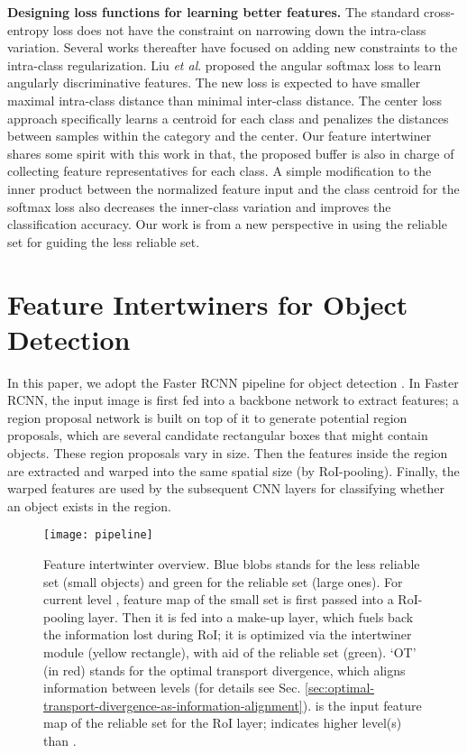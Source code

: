 \documentclass{article} \usepackage{iclr2019_conference,times}
\begin{document}
\textbf{Designing loss functions for learning better features.} The standard cross-entropy loss does not have the constraint on narrowing down the intra-class variation. 
Several works thereafter have focused on adding new constraints to the intra-class regularization.
Liu \textit{et al}. \citep{liu2017_spherical_loss} proposed the angular softmax loss to learn angularly discriminative features. The new loss is expected to have smaller maximal intra-class distance than
minimal inter-class distance. 
The center loss \citep{wen2016_center_loss} approach specifically learns a centroid for each class and penalizes the distances between samples within the category and the center. Our feature intertwiner shares some spirit with this work in that, the proposed buffer is also in charge of collecting feature representatives for each class. A simple modification \citep{liu2017_coco_v2} to the inner product between the normalized feature input and the class centroid for the softmax loss also decreases the inner-class variation and improves the classification accuracy. Our work is from a new perspective in using the reliable set for guiding the less reliable set.
 





\section{Feature Intertwiners for Object Detection}





In this paper, we adopt the Faster RCNN pipeline for object detection \citep{he2016_resnet,he2017_mask_rcnn,ross15_fast_rcnn}. In Faster RCNN, the input image is first fed into a backbone network to extract features; a region proposal network \citep{ren2015_faster_rcnn} is built on top of it to generate potential region proposals, which are several candidate rectangular boxes that might contain objects. These region proposals vary in size. Then the features inside the region are extracted and warped into the same spatial size (by RoI-pooling). Finally, the warped features are used by the subsequent CNN layers for classifying whether an object exists in the region. 





\begin{figure}[h]
\centering
		\texttt{[image: pipeline]}
		\caption{
			Feature intertwinter overview. 
			Blue blobs stands for the less reliable set (small objects) and green for the reliable set (large ones).
			For current level , 
feature map  of the small set is first passed into a RoI-pooling layer. Then it is fed into a make-up layer, which fuels back the information lost during RoI; it is optimized via the intertwiner module  (yellow rectangle), with aid of the reliable set (green). `OT' (in red) stands for the optimal transport divergence, which aligns information between levels (for details see Sec. \ref{sec:optimal-transport-divergence-as-information-alignment}).
			 is the input feature map of the reliable set for the RoI layer;  indicates higher level(s) than .
		} \label{fig:overview}
\end{figure}
\end{document}
